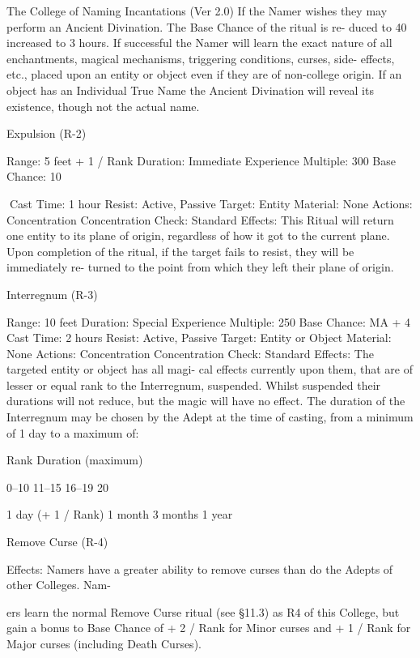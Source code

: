 \begin{Chapter}{The College of Naming Incantations (Ver 2.0)}
If the Namer wishes they may perform an Ancient 
Divination.  The  Base  Chance  of  the  ritual  is  re-
duced  to  40%
increased  to  3  hours.  If  successful  the  Namer  will 
learn the exact nature of all enchantments, magical 
mechanisms,  triggering  conditions,  curses,  side-
effects, etc., placed upon an entity or object even if 
they  are  of  non-college  origin.  If  an  object  has  an 
Individual  True  Name  the  Ancient  Divination  will 
reveal its existence, though not the actual name. 

Expulsion (R-2) 

Range: 5 feet + 1 / Rank 
Duration: Immediate 
Experience Multiple: 300 
Base Chance: 10%

Cast Time: 1 hour 
Resist: Active, Passive 
Target: Entity 
Material: None 
Actions: Concentration 
Concentration Check: Standard 
Effects:  This  Ritual  will  return  one  entity  to  its 
plane  of  origin,  regardless  of  how  it  got  to  the 
current plane. Upon completion of the ritual, if the 
target  fails  to  resist,  they  will  be  immediately  re-
turned to the point from which they left their plane 
of origin. 

Interregnum (R-3) 

Range: 10 feet 
Duration: Special 
Experience Multiple: 250 
Base Chance: MA + 4%
Cast Time: 2 hours 
Resist: Active, Passive 
Target: Entity or Object 
Material: None 
Actions: Concentration 
Concentration Check: Standard 
Effects: The targeted entity or object has all magi-
cal effects currently upon them, that are of lesser or 
equal  rank  to  the  Interregnum,  suspended.  Whilst 
suspended  their  durations  will  not  reduce,  but  the 
magic  will  have  no  effect.  The  duration  of  the 
Interregnum  may  be  chosen  by  the  Adept  at  the 
time  of  casting,  from  a  minimum  of  1  day  to  a 
maximum of: 

Rank  Duration (maximum) 

0–10 
11–15 
16–19 
20 

1 day (+ 1 / Rank) 
1 month 
3 months 
1 year 

Remove Curse (R-4) 

Effects:  Namers  have  a  greater  ability  to  remove 
curses than do the Adepts of other Colleges. Nam-

ers  learn  the  normal  Remove  Curse  ritual  (see 
§11.3)  as  R4  of  this  College,  but  gain  a  bonus  to 
Base Chance of + 2 / Rank for Minor curses and + 
1  /  Rank  for  Major  curses  (including  Death 
Curses). 


\end{Chapter}
